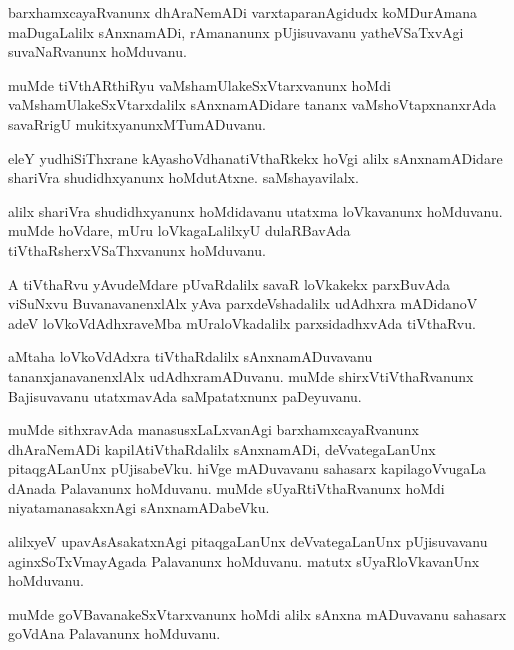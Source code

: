 \documentclass{article}
\begin{document}
\begin{mn}
barxhamxcayaRvanunx dhAraNemADi varxtaparanAgidudx koMDurAmana maDugaLalilx sAnxnamADi, rAmananunx 
pUjisuvavanu yatheVSaTxvAgi suvaNaRvanunx hoMduvanu.
\end{mn}

\begin{mn}
muMde tiVthARthiRyu vaMshamUlakeSxVtarxvanunx hoMdi vaMshamUlakeSxVtarxdalilx sAnxnamADidare tananx
vaMshoVtapxnanxrAda savaRrigU mukitxyanunxMTumADuvanu.
\end{mn}

\begin{mn}
eleY yudhiSiThxrane kAyashoVdhanatiVthaRkekx hoVgi alilx sAnxnamADidare shariVra shudidhxyanunx 
hoMdutAtxne. saMshayavilalx.
\end{mn}

\begin{mn}
alilx shariVra shudidhxyanunx hoMdidavanu utatxma loVkavanunx hoMduvanu. muMde hoVdare, mUru
loVkagaLalilxyU dulaRBavAda tiVthaRsherxVSaThxvanunx hoMduvanu.
\end{mn}

\begin{mn}
A tiVthaRvu yAvudeMdare pUvaRdalilx savaR loVkakekx parxBuvAda viSuNxvu BuvanavanenxlAlx yAva 
parxdeVshadalilx  udAdhxra mADidanoV adeV loVkoVdAdhxraveMba mUraloVkadalilx parxsidadhxvAda 
tiVthaRvu.
\end{mn}

\begin{mn}
aMtaha loVkoVdAdxra tiVthaRdalilx sAnxnamADuvavanu tananxjanavanenxlAlx udAdhxramADuvanu. muMde 
shirxVtiVthaRvanunx Bajisuvavanu utatxmavAda saMpatatxnunx paDeyuvanu.
\end{mn}

\begin{mn}
muMde sithxravAda manasusxLaLxvanAgi barxhamxcayaRvanunx dhAraNemADi kapilAtiVthaRdalilx sAnxnamADi,
deVvategaLanUnx pitaqgALanUnx pUjisabeVku. hiVge mADuvavanu sahasarx kapilagoVvugaLa dAnada 
Palavanunx  hoMduvanu. muMde sUyaRtiVthaRvanunx hoMdi niyatamanasakxnAgi sAnxnamADabeVku.
\end{mn}

\begin{mn}
alilxyeV upavAsAsakatxnAgi pitaqgaLanUnx deVvategaLanUnx pUjisuvavanu aginxSoTxVmayAgada Palavanunx 
hoMduvanu. matutx sUyaRloVkavanUnx hoMduvanu.
\end{mn}

\begin{mn}
muMde goVBavanakeSxVtarxvanunx hoMdi alilx sAnxna mADuvavanu sahasarx goVdAna Palavanunx hoMduvanu.
\end{mn}
\end{document}
